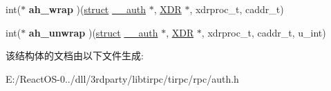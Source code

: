 \begin{DoxyCompactItemize}
int($\ast$ {\bfseries ah\+\_\+wrap} )(\hyperlink{interfacestruct}{struct} \hyperlink{struct____auth}{\+\_\+\+\_\+auth} $\ast$, \hyperlink{struct____rpc__xdr}{X\+DR} $\ast$, xdrproc\+\_\+t, caddr\+\_\+t)
\item 
\mbox{\label{struct____auth_1_1auth__ops_a6876d2ab113eb6324d52ade970242425}} 
int($\ast$ {\bfseries ah\+\_\+unwrap} )(\hyperlink{interfacestruct}{struct} \hyperlink{struct____auth}{\+\_\+\+\_\+auth} $\ast$, \hyperlink{struct____rpc__xdr}{X\+DR} $\ast$, xdrproc\+\_\+t, caddr\+\_\+t, u\+\_\+int)
\end{DoxyCompactItemize}


该结构体的文档由以下文件生成\+:\begin{DoxyCompactItemize}
\item 
E\+:/\+React\+O\+S-\/0../dll/3rdparty/libtirpc/tirpc/rpc/auth.\+h\end{DoxyCompactItemize}
